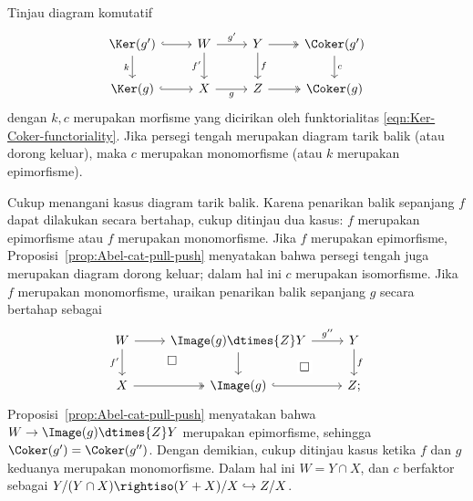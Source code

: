 \begin{korolari}\label{prop:Abel-cat-Coker-pull}
	Tinjau diagram komutatif
	\[\begin{tikzcd}
		\Ker(g') \arrow[hookrightarrow, r] \arrow[d, "k"'] & W \arrow[r, "{g'}"] \arrow[d, "{f'}"'] & Y \arrow[d, "f"] \arrow[twoheadrightarrow, r] & \Coker(g') \arrow[d, "c"] \\
		\Ker(g) \arrow[hookrightarrow, r] & X \arrow[r, "g"'] & Z \arrow[twoheadrightarrow, r] & \Coker(g)
	\end{tikzcd}\]
	dengan $k,c$ merupakan morfisme yang dicirikan oleh funktorialitas
	\eqref{eqn:Ker-Coker-functoriality}. Jika persegi tengah merupakan diagram
	tarik balik (atau dorong keluar), maka $c$ merupakan monomorfisme (atau $k$
	merupakan epimorfisme).
\end{korolari}
\begin{bukti}
	Cukup menangani kasus diagram tarik balik. Karena penarikan balik sepanjang
	$f$ dapat dilakukan secara bertahap, cukup ditinjau dua kasus: $f$
	merupakan epimorfisme atau $f$ merupakan monomorfisme. Jika $f$ merupakan
	epimorfisme, Proposisi~\ref{prop:Abel-cat-pull-push} menyatakan bahwa
	persegi tengah juga merupakan diagram dorong keluar; dalam hal ini $c$
	merupakan isomorfisme. Jika $f$ merupakan monomorfisme, uraikan penarikan balik
	sepanjang $g$ secara bertahap sebagai
	\[\begin{tikzcd}
		W \arrow[d, "{f'}"'] \arrow[r] & \Image(g) \dtimes{Z} Y \arrow[r, "{g''}"] \arrow[d] & Y \arrow[d, "f"] \\
		X \arrow[twoheadrightarrow, r] & \Image(g) \arrow[hookrightarrow, r] \arrow[phantom, lu, "\Box" description] & Z ; \arrow[phantom, lu, "\Box" description]
	\end{tikzcd}\]
	Proposisi~\ref{prop:Abel-cat-pull-push} menyatakan bahwa
	$W\to\Image(g)\dtimes{Z}Y$ merupakan epimorfisme, sehingga
	$\Coker(g')=\Coker(g'')$. Dengan demikian, cukup ditinjau kasus
	ketika $f$ dan $g$ keduanya merupakan monomorfisme. Dalam hal ini
	$W=Y\cap X$, dan $c$ berfaktor sebagai
	$Y/(Y\cap X)\rightiso(Y+X)/X\hookrightarrow Z/X$.
\end{bukti}

